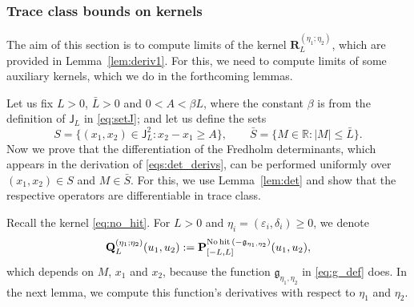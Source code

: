 \documentclass[oneside,final,11pt]{amsart}
\theoremstyle{definition}
\newcommand\nohit{\uptext{No\! hit}}
\newcommand{\fg}{\mathfrak{g}}
\newcommand{\bJ}{\mathsf{J}}
\newcommand{\R}{\mathbb{R}}
\newcommand{\1}[1]{\mathbf{1}_{#1}}
\newcommand{\eps}{\varepsilon}
\newcommand{\kmtext}[1]{{\color{red}[KM:#1]}}
\newcommand{\uptext}[1]{\text{\upshape{#1}}}
\newcommand{\fx}{x}
\newcommand{\fM}{M}
\newcommand{\fP}{\mathbf{P}}
\newcommand{\fQ}{\mathbf{Q}}
\newcommand{\fR}{\mathbf{R}}
\numberwithin{equation}{section}
\begin{document}
 \subsubsection{Trace class bounds on kernels}
\label{sec:trace}

The aim of this section is to compute limits of the kernel $\fR_L^{(\eta_1; \eta_2)}$, which are provided in Lemma~\ref{lem:deriv1}. For this, we need to compute limits of some auxiliary kernels, which we do in the forthcoming lemmas.

Let us fix $L > 0$, $\bar L > 0$ and $0 < A < \beta L$, where the constant $\beta$ is from the definition of $\bJ_L$ in \eqref{eq:setJ}; and let us define the sets
 \begin{equation}\label{eq:setsS}
 S = \{(x_1, x_2) \in \bJ^2_L : x_2 - x_1 \geq A \}, \qquad \bar S = \{ M \in \R : |M| \leq \bar L\}.
 \end{equation}
Now we prove that the differentiation of the Fredholm determinants, which appears in the derivation of \eqref{eqs:det_derivs}, can be performed uniformly over $(x_1, x_2) \in S$ and $M \in \bar S$. For this, we use Lemma~\ref{lem:det} and show that the respective operators are differentiable in trace class.

Recall the kernel \eqref{eq:no_hit}. For $L > 0$ and $\eta_i = (\eps_i, \delta_i) \geq 0$,
we denote%
\begin{equation}\label{e:Q_def}
\fQ_L^{(\eta_1; \eta_2)}(u_1, u_2) := \fP_{[-L,L]}^{\nohit\,(-\fg_{\eta_1, \eta_2})}(u_1,u_2),
\end{equation}
which depends on $\fM$, $\fx_1$ and $\fx_2$, because the function $\fg_{\eta_1, \eta_2}$ in \eqref{eq:g_def} does.
In the next lemma, we compute this function's derivatives with respect to $\eta_1$ and $\eta_2$.
\end{document}
